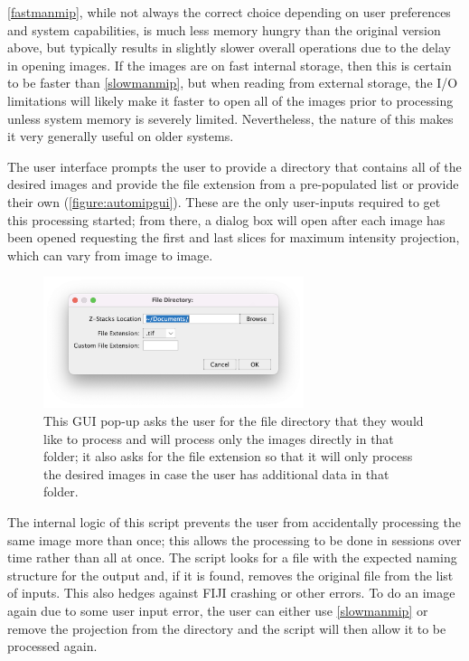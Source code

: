 \autoref{fastmanmip}, while not always the correct choice depending on user preferences and system capabilities, is much less memory hungry than the original version above, but typically results in slightly slower overall operations due to the delay in opening images. If the images are on fast internal storage, then this is certain to be faster than \autoref{slowmanmip}, but when reading from external storage, the I/O limitations will likely make it faster to open all of the images prior to processing unless system memory is severely limited. Nevertheless, the nature of this makes it very generally useful on older systems.

The user interface prompts the user to provide a directory that contains all of the desired images and provide the file extension from a pre\hyp{}populated list or provide their own (\autoref{figure:automipgui}). These are the only user\hyp{}inputs required to get this processing started; from there, a dialog box will open after each image has been opened requesting the first and last slices for maximum intensity projection, which can vary from image to image.

\begin{figure}
\centering
\includegraphics[width=3in]{images/automipgui.png}
\caption[GUI for maximum intensity projection with automatic image opening]{This GUI pop\hyp{}up asks the user for the file directory that they would like to process and will process only the images directly in that folder; it also asks for the file extension so that it will only process the desired images in case the user has additional data in that folder.}
\label{figure:automipgui}
\end{figure}

The internal logic of this script prevents the user from accidentally processing the same image more than once; this allows the processing to be done in sessions over time rather than all at once. The script looks for a file with the expected naming structure for the output and, if it is found, removes the original file from the list of inputs. This also hedges against FIJI crashing or other errors. To do an image again due to some user input error, the user can either use \autoref{slowmanmip} or remove the projection from the directory and the script will then allow it to be processed again. 

